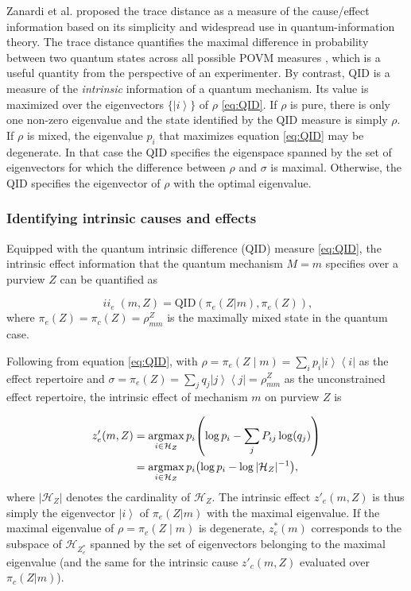 \documentclass[preprints, article, accept, pdftex, moreauthors, letterpaper]{Definitions/mdpi}
\newcommand{\ket}[1]{\left| #1 \right>} %
\newcommand{\bra}[1]{\left< #1 \right|} %
\renewcommand{\=}[1]{\stackrel{#1}{=}} %
\newcommand{\QID}{\text{QID}}
\DeclareMathOperator{\ii}{\mathit{ii}}
\renewcommand{\*}{\otimes}%
\newcommand*{\argmax}{\operatornamewithlimits{argmax}\limits}
\begin{document}
Zanardi et al. \cite{Zanardi2018} proposed the trace distance as a measure of the cause/effect information based on its simplicity and widespread use in quantum-information theory. The trace distance quantifies the maximal difference in probability between two quantum states across all possible POVM measures \cite{NielsonChuang2011}, which is a useful quantity from the perspective of an experimenter. 
By contrast, QID is a measure of the \textit{intrinsic} information of a quantum mechanism. Its value is maximized over the eigenvectors $\{\ket{i}\}$ of $\rho$ \eqref{eq:QID}. 
If $\rho$ is pure, there is only one non-zero eigenvalue and the state identified by the $\QID$ measure is simply $\rho$. If $\rho$ is mixed, the eigenvalue $p_i$ that maximizes equation \eqref{eq:QID} may be degenerate. In that case the QID specifies the eigenspace spanned by the set of eigenvectors for which the difference between $\rho$ and $\sigma$ is maximal. Otherwise, the QID specifies the eigenvector of $\rho$ with the optimal eigenvalue.

\subsubsection{Identifying intrinsic causes and effects}
\label{intrinsicce}
Equipped with the quantum intrinsic difference (QID) measure \eqref{eq:QID}, the intrinsic effect information that the quantum mechanism $M = m$ specifies over a purview $Z$ can be quantified as

\begin{equation}
    \ii_e(m,Z) = \QID\left(\pi_e(Z|m), \pi_e(Z)\right),
\end{equation}
where $\pi_e(Z) = \pi_c(Z) = \rho^Z_{mm}$ is the maximally mixed state in the quantum case.

Following from equation \eqref{eq:QID}, with $\rho = \pi_e(Z\mid m) = \sum_i p_i \ket{i}\bra{i}$ as the effect repertoire and $\sigma = \pi_e(Z) = \sum_j q_j \ket{j}\bra{j} = \rho^Z_{mm}$ as the unconstrained effect repertoire, the intrinsic effect of mechanism $m$ on purview $Z$ is

\begin{equation}
\begin{split}
\label{eq:z'}
    z_e'(m,Z) &= \argmax_{i \in \mathcal{H}_{Z}} p_i \left( \log p_i - \sum_j P_{ij} \log (q_j) \right) \\
    &= \argmax_{i \in \mathcal{H}_{Z}} p_i \left( \log p_i - \log |\mathcal{H}_{Z}|^{-1} \right),
\end{split}
\end{equation}
where $|\mathcal{H}_{Z}|$ denotes the cardinality of $\mathcal{H}_{Z}$. 
The intrinsic effect $z'_e(m,Z)$ is thus simply the eigenvector $\ket{i}$ of $\pi_e(Z|m)$ with the maximal eigenvalue. If the maximal eigenvalue of $\rho = \pi_e(Z\mid m)$ is degenerate, $z^*_e(m)$ corresponds to the subspace of $\mathcal{H}_{Z_e^*}$ spanned by the set of eigenvectors belonging to the maximal eigenvalue
(and the same for the intrinsic cause $z'_c(m,Z)$ evaluated over $\pi_c(Z|m)$).
\end{document}
